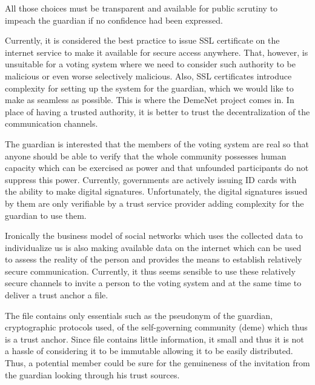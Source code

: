 \documentclass[12pt,a4paper]{article}
\renewcommand{\texttt}[1]{\jlinl{#1}}
\begin{document}
All those choices must be transparent and available for public scrutiny to impeach the guardian if no confidence had been expressed.\par
Currently, it is considered the best practice to issue SSL certificate on the internet service to make it available for secure access anywhere. That, however, is unsuitable for a voting system where we need to consider such authority to be malicious or even worse selectively malicious. Also, SSL certificates introduce complexity for setting up the system for the guardian, which we would like to make as seamless as possible. This is where the DemeNet project comes in. In place of having a trusted authority, it is better to trust the decentralization of the communication channels.\par
The guardian is interested that the members of the voting system are real so that anyone should be able to verify that the whole community possesses human capacity which can be exercised as power and that unfounded participants do not suppress this power. Currently, governments are actively issuing ID cards with the ability to make digital signatures. Unfortunately, the digital signatures issued by them are only verifiable by a trust service provider adding complexity for the guardian to use them.\par
Ironically the business model of social networks which uses the collected data to individualize us is also making available data on the internet which can be used to assess the reality of the person and provides the means to establish relatively secure communication. Currently, it thus seems sensible to use these relatively secure channels to invite a person to the voting system and at the same time to deliver a trust anchor a \texttt{DemeSpec} file.\par
The \texttt{DemeSpec} file contains only essentials such as the pseudonym of the guardian, cryptographic protocols used, \texttt{UUID} of the self-governing community (deme) which thus is a trust anchor. Since \texttt{DemeSpec} file contains little information, it small and thus it is not a hassle of considering it to be immutable allowing it to be easily distributed. Thus, a potential member could be sure for the genuineness of the invitation from the guardian looking through his trust sources.\par
\end{document}

